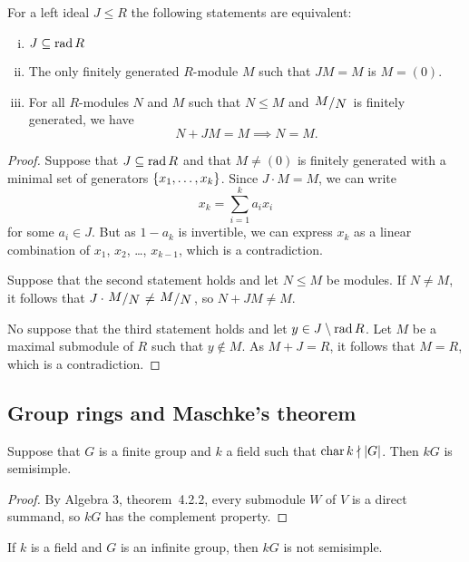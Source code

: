 \begin{lema}[Nakayama]
For a left ideal $J \leq R$ the following statements are
equivalent:

\begin{enumerate}[i)]
\item $J \subseteq \operatorname{rad} R$
\item The only finitely generated $R$-module $M$ such that
$JM = M$ is $M = (0)$.
\item For all $R$-modules $N$ and $M$ such that $N \leq M$ and
$\kvoc{M}{N}$ is finitely generated, we have
\[
N + J M = M \implies N = M.
\]
\end{enumerate}
\end{lema}

\begin{proof}
Suppose that $J \subseteq \operatorname{rad} R$ and that $M \ne (0)$ is finitely
generated with a minimal set of generators $\left\{x_1, \dots, x_k\right\}$.
Since $J \cdot M = M$, we can write
\[
x_k = \sum_{i=1}^k a_i x_i
\]
for some $a_i \in J$. But as $1 - a_k$ is invertible, we can
express $x_k$ as a linear combination of $x_1$, $x_2$, \dots,
$x_{k-1}$, which is a contradiction.

Suppose that the second statement holds and let $N \leq M$ be
modules. If $N \ne M$, it follows that
$J \cdot \kvoc{M}{N} \ne \kvoc{M}{N}$, so $N + JM \ne M$.

No suppose that the third statement holds and let
$y \in J \setminus \operatorname{rad} R$. Let $M$ be a maximal submodule of $R$
such that $y \not \in M$. As $M + J = R$, it follows that $M = R$,
which is a contradiction.
\end{proof}

\newpage

\subsection{Group rings and Maschke's theorem}

\begin{izrek}[Maschke]
Suppose that $G$ is a finite group and $k$ a field such that
$\operatorname{char} k \nmid \left\lvert G\right\rvert$. Then $kG$ is semisimple.
\end{izrek}

\begin{proof}
By Algebra 3, theorem~4.2.2, every submodule $W$ of $V$ is a direct
summand, so $kG$ has the complement property.
\end{proof}

\begin{trditev}
If $k$ is a field and $G$ is an infinite group, then $kG$ is not
semisimple.
\end{trditev}

